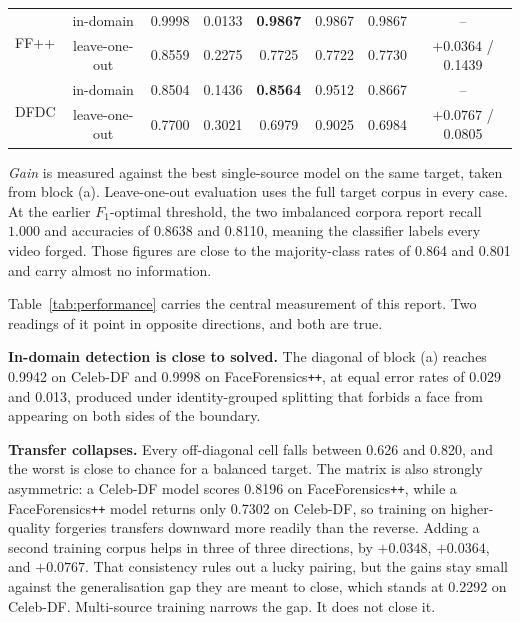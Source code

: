 \documentclass[journal,onecolumn]{IEEEtran}
\newcommand{\celebdf}{Celeb-DF}
\newcommand{\best}[1]{\textbf{#1}}
\begin{document}
\begin{table}[!ht]
\begin{tabular}{lccccccc}
\midrule

\multirow{2}{*}{FF++}
& in-domain
& 0.9998
& 0.0133
& \best{0.9867}
& 0.9867
& 0.9867
& -- \\

& leave-one-out
& 0.8559
& 0.2275
& 0.7725
& 0.7722
& 0.7730
& \best{$+0.0364$} / 0.1439 \\

\midrule

\multirow{2}{*}{DFDC}
& in-domain
& 0.8504
& 0.1436
& \best{0.8564}
& 0.9512
& 0.8667
& -- \\

& leave-one-out
& 0.7700
& 0.3021
& 0.6979
& 0.9025
& 0.6984
& \best{$+0.0767$} / 0.0805 \\

\bottomrule
\end{tabular}

\vspace{0.5ex}

\begin{minipage}{0.95\textwidth}
\footnotesize
\emph{Gain} is measured against the best single-source model on the same target,
taken from block (a). Leave-one-out evaluation uses the full target corpus in
every case. At the earlier $F_1$-optimal threshold, the two imbalanced corpora
report recall $1.000$ and accuracies of 0.8638 and 0.8110, meaning the classifier
labels every video forged. Those figures are close to the majority-class rates
of 0.864 and 0.801 and carry almost no information.
\end{minipage}

\end{table}

Table~\ref{tab:performance} carries the central measurement of this report. Two
readings of it point in opposite directions, and both are true.

\textbf{In-domain detection is close to solved.} The diagonal of block (a)
reaches 0.9942 on \celebdf{} and 0.9998 on FaceForensics\texttt{++}, at equal
error rates of 0.029 and 0.013, produced under identity-grouped splitting that
forbids a face from appearing on both sides of the boundary.

\textbf{Transfer collapses.} Every off-diagonal cell falls between 0.626 and
0.820, and the worst is close to chance for a balanced target. The matrix is also
strongly asymmetric: a \celebdf{} model scores 0.8196 on
FaceForensics\texttt{++}, while a FaceForensics\texttt{++} model returns only
0.7302 on \celebdf{}, so training on higher-quality forgeries transfers downward
more readily than the reverse. Adding a second training corpus helps in three of
three directions, by $+0.0348$, $+0.0364$, and $+0.0767$. That consistency rules
out a lucky pairing, but the gains stay small against the generalisation gap they
are meant to close, which stands at 0.2292 on \celebdf{}. Multi-source training
narrows the gap. It does not close it.
\end{document}
